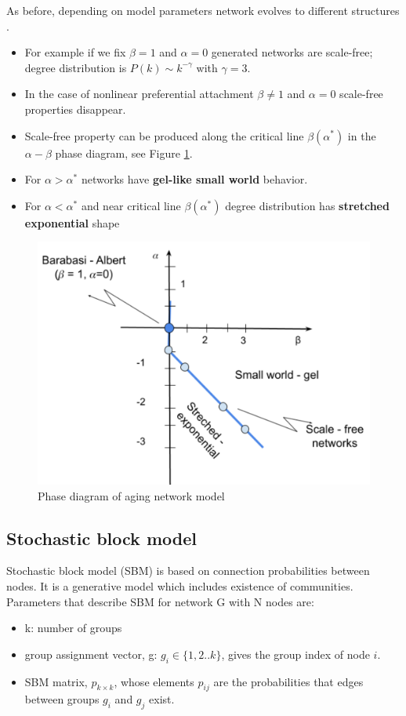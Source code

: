 As before, depending on model parameters network evolves to different structures \cite{hajra2004}.  
\begin{itemize}
	\item For example if we fix $\beta=1$ and $\alpha=0$ generated networks are scale-free; degree distribution is $P(k) \sim k^{-\gamma}$ with $\gamma=3$.
	\item In the case of nonlinear preferential attachment $\beta \neq 1$ and $\alpha=0$ scale-free properties disappear. 
	\item Scale-free property can be produced along the critical line $\beta(\alpha^{*})$ in the $\alpha-\beta$ phase diagram, see Figure \ref{fig:diagram}.
	
	\item For $\alpha>\alpha^{*}$ networks have \textbf{gel-like small world} behavior.
	
	\item For $\alpha<\alpha^{*}$ and near critical line $\beta(\alpha^{*})$ degree distribution has \textbf{stretched exponential} shape
	
\end{itemize}

\begin{figure}[!ht]
	\centering
	\includegraphics[width=0.6\linewidth]{Figures/diagram.png}
	\caption{Phase diagram of aging network model}
	\label{fig:diagram}
\end{figure}

\subsection{Stochastic block model}


Stochastic block model (SBM) is based on connection probabilities between nodes. It is a generative model which includes existence of communities. Parameters that describe SBM for network G with N nodes are:

\begin{itemize}
	\item k: number of groups
	\item group assignment vector, g: $g_i \in\{1,2..k\}$, gives the group index of node $i$.
	\item SBM matrix, $p_{k \times k}$, whose elements $p_{ij}$ are the probabilities that edges between groups $g_i$ and $g_j$ exist.
\end{itemize}

